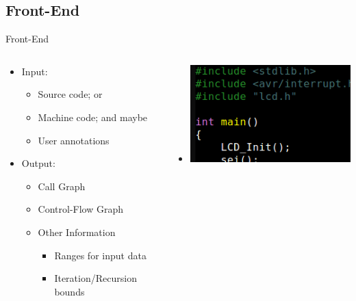 \documentclass{beamer}
\begin{document}
\subsection{Front-End}
\begin{frame}{Front-End}
  \begin{columns}
    \begin{column}{0.6\textwidth}
      \begin{itemize}
        \item<1-> Input:
          \begin{itemize}
            \item Source code; or
            \item Machine code; and maybe
            \item User annotations
          \end{itemize}
        \item<2-> Output:
          \begin{itemize}
            \item Call Graph
            \item Control-Flow Graph
            \item Other Information
              \begin{itemize}
              \item Ranges for input data
              \item Iteration/Recursion bounds
              \end{itemize}
          \end{itemize}
      \end{itemize}
    \end{column}
    \begin{column}{0.4\textwidth}
      \begin{center}
        \begin{itemize}
          \item<1->[] \includegraphics[scale=0.3]{code.png}

\end{itemize}
\end{center}
\end{column}
\end{columns}
\end{frame}
\end{document}
